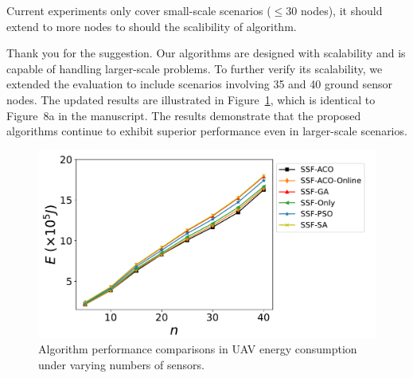 \begin{revcomment}
	Current experiments only cover small-scale scenarios ($\leq 30$ nodes), it should extend to more nodes to should the scalibility of algorithm.
\end{revcomment}
\begin{revresponse}
	Thank you for the suggestion.
	Our algorithms are designed with scalability and is capable of handling larger-scale problems.
	To further verify its scalability, we extended the evaluation to include scenarios involving 35 and 40 ground sensor nodes. The updated results are illustrated in Figure~\ref{fig:40nodes}, which is identical to Figure~8a in the manuscript. The results demonstrate that the proposed algorithms continue to exhibit superior performance even in larger-scale scenarios.
	\begin{figure}[h]
		\centerline{\includegraphics[width=.6\textwidth]{fig/exp_number_40_legend.pdf}}
		\caption{Algorithm performance comparisons in UAV energy consumption under varying numbers of sensors.}
		\label{fig:40nodes}
	\end{figure}
\end{revresponse}

